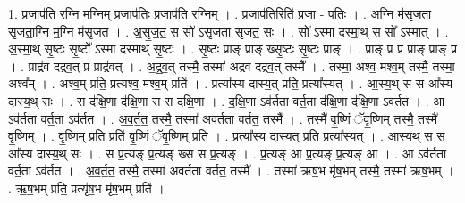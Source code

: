 \documentclass[17pt]{extarticle}
\begin{document}
1. प्र॒जाप॑ति र॒ग्नि म॒ग्निम् प्र॒जाप॑तिः प्र॒जाप॑ति र॒ग्निम् । . प्र॒जाप॑ति॒रिति॑ प्र॒जा - प॒तिः॒ । . अ॒ग्नि म॑सृजता सृजता॒ग्नि म॒ग्नि म॑सृजत । . अ॒सृ॒ज॒त॒ स सो॑ ऽसृजता सृजत॒ सः । . सो᳚ ऽस्मा दस्मा॒थ् स सो᳚ ऽस्मात् । . अ॒स्मा॒थ् सृ॒ष्टः सृ॒ष्टो᳚ ऽस्मा दस्माथ् सृ॒ष्टः । . सृ॒ष्टः प्राङ् प्राङ् ख्सृ॒ष्टः सृ॒ष्टः प्राङ् । . प्राङ् प्र प्र प्राङ् प्राङ् प्र । . प्राद्र॑व दद्रव॒त् प्र प्राद्र॑वत् । . अ॒द्र॒व॒त् तस्मै॒ तस्मा॑ अद्रव दद्रव॒त् तस्मै᳚ । . तस्मा॒ अश्व॒ मश्व॒म् तस्मै॒ तस्मा॒ अश्व᳚म् । . अश्व॒म् प्रति॒ प्रत्यश्व॒ मश्व॒म् प्रति॑ । . प्रत्या᳚स्य दास्य॒त् प्रति॒ प्रत्या᳚स्यत् । . आ॒स्य॒थ् स स आ᳚स्य दास्य॒थ् सः । . स द॑क्षि॒णा द॑क्षि॒णा स स द॑क्षि॒णा । . द॒क्षि॒णा ऽव॑र्तता वर्त॒ता द॑क्षि॒णा द॑क्षि॒णा ऽव॑र्तत । . आ ऽव॑र्तता वर्त॒ता ऽव॑र्तत । . अ॒व॒र्त॒त॒ तस्मै॒ तस्मा॑ अवर्तता वर्तत॒ तस्मै᳚ । . तस्मै॑ वृ॒ष्णिं ॅवृ॒ष्णिम् तस्मै॒ तस्मै॑ वृ॒ष्णिम् । . वृ॒ष्णिम् प्रति॒ प्रति॑ वृ॒ष्णिं ॅवृ॒ष्णिम् प्रति॑ । . प्रत्या᳚स्य दास्य॒त् प्रति॒ प्रत्या᳚स्यत् । . आ॒स्य॒थ् स स आ᳚स्य दास्य॒थ् सः । . स प्र॒त्यङ् प्र॒त्यङ् ख्स स प्र॒त्यङ् । . प्र॒त्यङ् आ प्र॒त्यङ् प्र॒त्यङ् आ । . आ ऽव॑र्तता वर्त॒ता ऽव॑र्तत । . अ॒व॒र्त॒त॒ तस्मै॒ तस्मा॑ अवर्तता वर्तत॒ तस्मै᳚ । . तस्मा॑ ऋष॒भ मृ॑ष॒भम् तस्मै॒ तस्मा॑ ऋष॒भम् । . ऋ॒ष॒भम् प्रति॒ प्रत्यृ॑ष॒भ मृ॑ष॒भम् प्रति॑ । \newline
\end{document}
